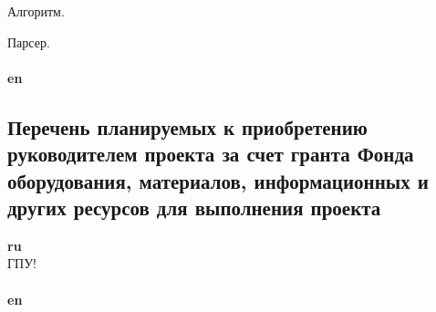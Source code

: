 \documentclass[12pt]{article}  %
\theoremstyle{remark}
\begin{document}
Алгоритм.

Парсер.
\\
\\
\textbf{en}\\

\subsection{Перечень планируемых к приобретению руководителем проекта за счет гранта Фонда оборудования, материалов, информационных и других ресурсов для выполнения проекта}

\textbf{ru}\\
ГПУ!
\\
\\
\textbf{en}\\
\end{document}
